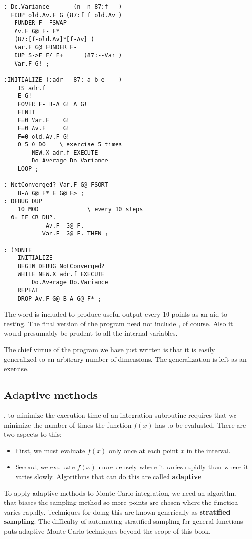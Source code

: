 \begin{multicols}{2}
    \begin{lstlisting}[basicstyle=\scriptsize,]
: Do.Variance       (n--n 87:f-- )
  FDUP old.Av.F G (87:f f old.Av )
   FUNDER F- FSWAP
   Av.F G@ F- F*
   (87:[f-old.Av]*[f-Av] )
   Var.F G@ FUNDER F-
   DUP S->F F/ F+      (87:--Var )
   Var.F G! ;

:INITIALIZE (:adr-- 87: a b e -- )
    IS adr.f
    E G!
    FOVER F- B-A G! A G!
    FINIT
    F=0 Var.F    G!
    F=0 Av.F     G!
    F=0 old.Av.F G!
    0 5 0 DO    \ exercise 5 times
        NEW.X adr.f EXECUTE
        Do.Average Do.Variance
    LOOP ;

: NotConverged? Var.F G@ FSORT
    B-A G@ F* E G@ F> ;
: DEBUG DUP
    10 MOD              \ every 10 steps
  0= IF CR DUP.
            Av.F  G@ F.
           Var.F  G@ F. THEN ;

: )MONTE
    INITIALIZE
    BEGIN DEBUG NotConverged?
    WHILE NEW.X adr.f EXECUTE
        Do.Average Do.Variance
    REPEAT
    DROP Av.F G@ B-A G@ F* ;
  \end{lstlisting}
\end{multicols}


The word  is included to produce useful output every 10 points as an aid to testing. The final version of the program need not include , of course. Also it would presumably be prudent to  all the internal variables.

The chief virtue of the program we have just written is that it is easily generalized to an arbitrary number of dimensions. The generalization is left as an exercise.

\subsection{Adaptlve methods}
, to minimize the execution time of an integration subroutine requires that we minimize the number of times the function $f(x)$ has to be evaluated. There are two aspects to this:
\begin{itemize}
    \item First, we must evaluate $f(x)$ only once at each point $x$ in the interval.
    \item Second, we evaluate $f(x)$ more densely where it varies rapidly than where it varies slowly. Algorithms that can do this are called \textbf{adaptive}.
\end{itemize}

To apply adaptive methods to Monte Carlo integration, we need an algorithm that biases the sampling method so more points are chosen where the function varies rapidly. Techniques for doing this are known generically as \textbf{stratified sampling}. The difficulty of automating stratified sampling for general functions puts adaptive Monte Carlo techniques beyond the scope of this book.

